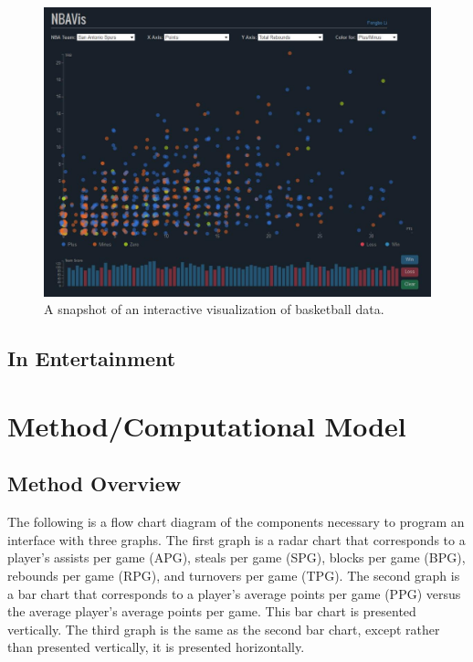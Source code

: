 \documentclass[journal]{vgtc}                %
\begin{document}
\begin{figure}[h]
\caption{A snapshot of an interactive visualization of basketball data.}
\includegraphics[width=\linewidth]{georgiatech.jpg}
\end{figure}
\subsection{In Entertainment}



\section{Method/Computational Model}
\subsection{Method Overview}
The following is a flow chart diagram of the components necessary to program an interface with three graphs. The first graph is a radar chart that corresponds to a player's assists per game (APG), steals per game (SPG), blocks per game (BPG), rebounds per game (RPG), and turnovers per game (TPG). The second graph is a bar chart that corresponds to a player's average points per game (PPG) versus the average player's average points per game. This bar chart is presented vertically. The third graph is the same as the second bar chart, except rather than presented vertically, it is presented horizontally. 
\end{document}
